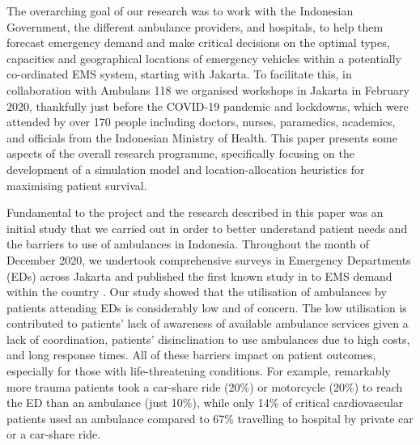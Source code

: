 \documentclass[preprint,12pt]{elsarticle}
\begin{document}
The overarching goal of our research was to work with the Indonesian Government,
the different ambulance providers, and hospitals, to help them forecast
emergency demand and make critical decisions on the optimal types, capacities
and geographical locations of emergency vehicles within a potentially
co-ordinated EMS system, starting with Jakarta. To facilitate this, in
collaboration with Ambulans 118 we organised workshops in Jakarta in February
2020, thankfully just before the COVID-19 pandemic and lockdowns, which were
attended by over 170 people including doctors, nurses, paramedics, academics,
and officials from the Indonesian Ministry of Health. This paper presents some
aspects of the overall research programme, specifically focusing on the
development of a simulation model and location-allocation heuristics for
maximising patient survival.  

Fundamental to the project and the research described in this paper was an
initial study that we carried out in order to better understand patient needs
and the barriers to use of ambulances in Indonesia. Throughout the month of
December 2020, we undertook comprehensive surveys in Emergency Departments (EDs)
across Jakarta and published the first known study in to EMS demand within the
country \cite{BriceSyaribahNoor2022Esui}. Our study showed that the utilisation
of ambulances by patients attending EDs is considerably low and of concern. The
low utilisation is contributed to patients’ lack of awareness of available
ambulance services given a lack of coordination, patients’ disinclination to use
ambulances due to high costs, and long response times.  All of these barriers
impact on patient outcomes, especially for those with  life-threatening
conditions. For example, remarkably more trauma patients took a car-share ride
(20\%) or motorcycle (20\%) to reach the ED than an ambulance (just 10\%), while
only 14\% of critical cardiovascular patients used an ambulance compared to 67\%
travelling to hospital by private car or a car-share ride.
\end{document}
